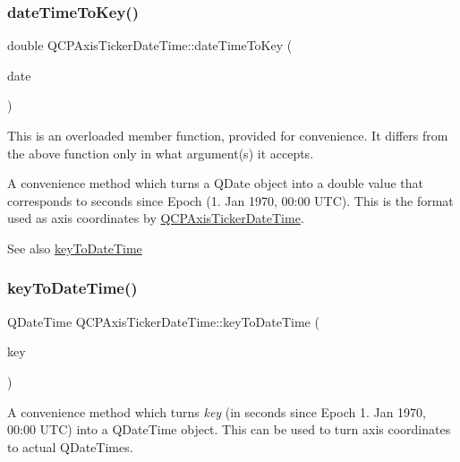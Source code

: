 \subsubsection{\texorpdfstring{date\+Time\+To\+Key()}{dateTimeToKey()}\hspace{0.1cm}{\footnotesize\ttfamily [2/2]}}
{\footnotesize\ttfamily double Q\+C\+P\+Axis\+Ticker\+Date\+Time\+::date\+Time\+To\+Key (\begin{DoxyParamCaption}\item[{const Q\+Date}]{date }\end{DoxyParamCaption})\hspace{0.3cm}{\ttfamily [static]}}

This is an overloaded member function, provided for convenience. It differs from the above function only in what argument(s) it accepts.

A convenience method which turns a Q\+Date object into a double value that corresponds to seconds since Epoch (1. Jan 1970, 00\+:00 U\+TC). This is the format used as axis coordinates by \hyperlink{classQCPAxisTickerDateTime}{Q\+C\+P\+Axis\+Ticker\+Date\+Time}.

\begin{DoxySeeAlso}{See also}
\hyperlink{classQCPAxisTickerDateTime_a4c1761ad057f5564804a53f942629b53}{key\+To\+Date\+Time} 
\end{DoxySeeAlso}
\mbox{\label{classQCPAxisTickerDateTime_a4c1761ad057f5564804a53f942629b53}} 
\subsubsection{\texorpdfstring{key\+To\+Date\+Time()}{keyToDateTime()}}
{\footnotesize\ttfamily Q\+Date\+Time Q\+C\+P\+Axis\+Ticker\+Date\+Time\+::key\+To\+Date\+Time (\begin{DoxyParamCaption}\item[{double}]{key }\end{DoxyParamCaption})\hspace{0.3cm}{\ttfamily [static]}}

A convenience method which turns {\itshape key} (in seconds since Epoch 1. Jan 1970, 00\+:00 U\+TC) into a Q\+Date\+Time object. This can be used to turn axis coordinates to actual Q\+Date\+Times.

